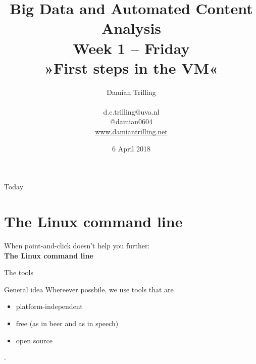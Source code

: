 \documentclass{beamer}
\begin{document}
\title[Big Data and Automated Content Analysis]{\textbf{Big Data and Automated Content Analysis} \\ Week 1 -- Friday \\ »First steps in the VM«}
\author[Damian Trilling]{Damian Trilling \\ ~ \\ \footnotesize{d.c.trilling@uva.nl \\@damian0604} \\ \url{www.damiantrilling.net}}
\date{6 April 2018}


\begin{frame}{}
\titlepage
\end{frame}

\begin{frame}{Today}
\tableofcontents
\end{frame}



\section{The Linux command line}

\begin{frame}
	When point-and-click doesn't help you further:\\
	\textbf{The Linux command line}
\end{frame}

\begin{frame}{The tools}
\begin{block}{General idea}
Whereever possbile, we use tools that are
\begin{itemize}
\item platform-independent 
\item free (as in beer and as in speech)
\item open source
\end{itemize}
\end{block}

.

\end{frame}




{
	\begin{frame}[plain]
	\end{frame}
}
\end{document}

